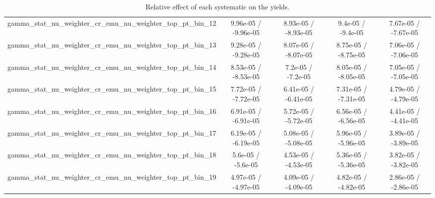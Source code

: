 \documentclass[10pt]{article}
\begin{document}
\begin{table}[htbp]
\begin{center}
\begin{tabular}{|c|c|c|c|c|}
  gamma_stat_nu_weighter_cr_emu_nu_weighter_top_pt_bin_12 & 9.96e-05 / -9.96e-05 & 8.93e-05 / -8.93e-05 & 9.4e-05 / -9.4e-05 & 7.67e-05 / -7.67e-05 \\ 
  gamma_stat_nu_weighter_cr_emu_nu_weighter_top_pt_bin_13 & 9.28e-05 / -9.28e-05 & 8.07e-05 / -8.07e-05 & 8.75e-05 / -8.75e-05 & 7.06e-05 / -7.06e-05 \\ 
  gamma_stat_nu_weighter_cr_emu_nu_weighter_top_pt_bin_14 & 8.53e-05 / -8.53e-05 & 7.2e-05 / -7.2e-05 & 8.05e-05 / -8.05e-05 & 7.05e-05 / -7.05e-05 \\ 
  gamma_stat_nu_weighter_cr_emu_nu_weighter_top_pt_bin_15 & 7.72e-05 / -7.72e-05 & 6.41e-05 / -6.41e-05 & 7.31e-05 / -7.31e-05 & 4.79e-05 / -4.79e-05 \\ 
  gamma_stat_nu_weighter_cr_emu_nu_weighter_top_pt_bin_16 & 6.91e-05 / -6.91e-05 & 5.72e-05 / -5.72e-05 & 6.56e-05 / -6.56e-05 & 4.41e-05 / -4.41e-05 \\ 
  gamma_stat_nu_weighter_cr_emu_nu_weighter_top_pt_bin_17 & 6.19e-05 / -6.19e-05 & 5.08e-05 / -5.08e-05 & 5.96e-05 / -5.96e-05 & 3.89e-05 / -3.89e-05 \\ 
  gamma_stat_nu_weighter_cr_emu_nu_weighter_top_pt_bin_18 & 5.6e-05 / -5.6e-05 & 4.53e-05 / -4.53e-05 & 5.36e-05 / -5.36e-05 & 3.82e-05 / -3.82e-05 \\ 
  gamma_stat_nu_weighter_cr_emu_nu_weighter_top_pt_bin_19 & 4.97e-05 / -4.97e-05 & 4.09e-05 / -4.09e-05 & 4.82e-05 / -4.82e-05 & 2.86e-05 / -2.86e-05 \\ 
\hline 
\end{tabular} 
\caption{Relative effect of each systematic on the yields.} 
\end{center} 
\end{table} 
\end{document}
